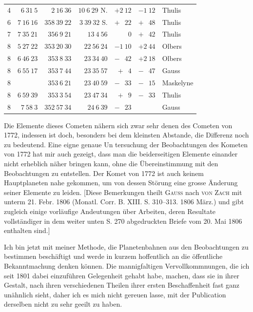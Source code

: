 \begin{center}
\begin{tabular}{r|r|r|r|r|r|l}
4 & $6\ 31\ 5$ & $2\ 16\ 36$ & $10\ 6\ 29$ N. & $+2\ 12$ & $-1\ 12$ & Thulis\\
6 & $7\ 16\ 16$ & $358\ 39\ 22$ & $3\ 39\ 32$ S. & $+\phantom{1}\ 22$ & $+\phantom{1}\ 48$ & Thulis\\
7 & $7\ 35\ 21$ & $356\ 9\ 21$ & $13\ 4\ 56$ & $\phantom{+1}\ 0$ & $+\phantom{1}\ 42$ & Thulis\\
8 & $5\ 27\ 22$ & $353\ 20\ 30$ & $22\ 56\ 24$ & $-1\ 10$ & $+2\ 44$ & Olbers\\
8 & $6\ 46\ 23$ & $353\ 8\ 33$ & $23\ 34\ 40$ & $-\phantom{1}\ 42$ & $+2\ 18$ & Olbers\\
8 & $6\ 55\ 17$ & $353\ 7\ 44$ & $23\ 35\ 57$ & $+\phantom{1}\ 4$ & $-\phantom{1}\ 47$ & Gauss\\
8 & & $353\ 6\ 21$ & $23\ 40\ 59$ & $-\phantom{1}\ 33$ & $-\phantom{1}\ 15$ & Maskelyne\\
8 & $6\ 59\ 39$ & $353\ 3\ 54$ & $23\ 47\ 34$ & $+\phantom{1}\ 9$ & $-\phantom{1}\ 33$ & Thulis\\
8 & $7\ 58\ 3$ & $352\ 57\ 34$ & $24\ 6\ 39$ & $-\phantom{1}\ 23$ & & Gauss\\
\end{tabular}\endgroup
\end{center}

\par\indent Die Elemente dieses Cometen nähern sich zwar sehr denen des Cometen von 1772, indessen ist doch, besonders bei dem kleinsten Abstande, die Differenz noch zu bedeutend. Eine eigne genaue Un%
%
tersuchung der Beobachtungen des Kometen von 1772 hat mir auch gezeigt, dass man die beiderseitigen Elemente einander nicht erheblich näher bringen kann, ohne die Übereinstimmung mit den Beobachtungen zu entstellen. Der Komet von 1772 ist auch keinem Hauptplaneten nahe gekommen, um von dessen Störung eine grosse Änderung seiner Elemente zu leiden. [Diese Bemerkungen theilt \textsc{Gauss} nach \textsc{von Zach} mit unterm 21. Febr. 1806 (Monatl. Corr. B. XIII. S. 310–313. 1806 März.) und gibt zugleich einige vorläufige Andeutungen über Arbeiten, deren Resultate vollständiger in dem weiter unten S. 270 abgedruckten Briefe vom 20. Mai 1806 enthalten sind.]

\par\indent Ich bin jetzt mit meiner Methode, die Planetenbahnen aus den Beobachtungen zu bestimmen beschäftigt und werde in kurzem hoffentlich an die öffentliche Bekanntmachung denken können. Die mannigfaltigen Vervollkommnungen, die ich seit 1801 dabei einzuführen Gelegenheit gehabt habe, machen, dass sie in ihrer Gestalt, nach ihren verschiedenen Theilen ihrer ersten Beschaffenheit fast ganz unähnlich sieht, daher ich es mich nicht gereuen lasse, mit der Publication derselben nicht zu sehr geeilt zu haben.

